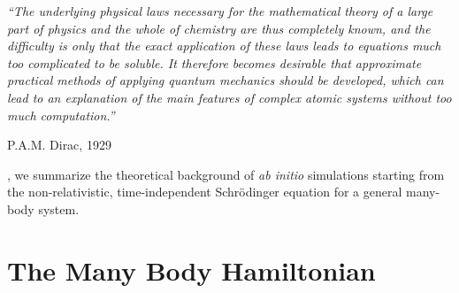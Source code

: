 \epigraph{\singlespacing \it ``The underlying physical laws necessary
for the mathematical theory of a large part of physics and the whole of chemistry
are thus completely known, and the difficulty is only that the exact application
of these laws leads to equations much too complicated to be soluble. It therefore becomes desirable that approximate practical methods of applying quantum
mechanics should be developed, which can lead to an explanation of the main
features of complex atomic systems without too much computation.''}{P.A.M. Dirac, 1929}

, we summarize the theoretical background of {\it ab initio} simulations starting from the non-relativistic, time-independent Schrödinger equation for a general many-body system.

\section{The Many Body Hamiltonian}

